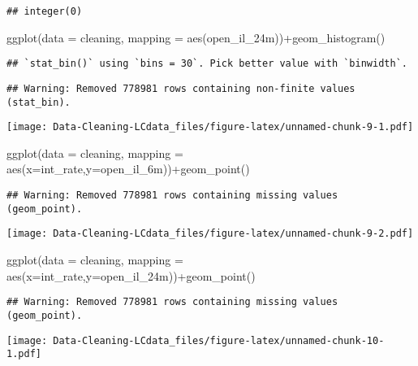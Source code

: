 \documentclass[
]{article}
\newenvironment{Shaded}{\begin{snugshade}}{\end{snugshade}}
\newcommand{\AttributeTok}[1]{\textcolor[rgb]{0.77,0.63,0.00}{#1}}
\newcommand{\ConstantTok}[1]{\textcolor[rgb]{0.00,0.00,0.00}{#1}}
\newcommand{\FunctionTok}[1]{\textcolor[rgb]{0.00,0.00,0.00}{#1}}
\newcommand{\NormalTok}[1]{#1}
\newcommand{\SpecialCharTok}[1]{\textcolor[rgb]{0.00,0.00,0.00}{#1}}
\begin{document}
\begin{Shaded}
\end{Shaded}

\begin{verbatim}
## integer(0)
\end{verbatim}

\begin{Shaded}
\begin{Highlighting}[]
\FunctionTok{ggplot}\NormalTok{(}\AttributeTok{data =}\NormalTok{ cleaning, }\AttributeTok{mapping =} \FunctionTok{aes}\NormalTok{(open\_il\_24m))}\SpecialCharTok{+}\FunctionTok{geom\_histogram}\NormalTok{()}
\end{Highlighting}
\end{Shaded}

\begin{verbatim}
## `stat_bin()` using `bins = 30`. Pick better value with `binwidth`.
\end{verbatim}

\begin{verbatim}
## Warning: Removed 778981 rows containing non-finite values (stat_bin).
\end{verbatim}

\texttt{[image: Data-Cleaning-LCdata\_files/figure-latex/unnamed-chunk-9-1.pdf]}

\begin{Shaded}
\begin{Highlighting}[]
\FunctionTok{ggplot}\NormalTok{(}\AttributeTok{data =}\NormalTok{ cleaning, }\AttributeTok{mapping =} \FunctionTok{aes}\NormalTok{(}\AttributeTok{x=}\NormalTok{int\_rate,}\AttributeTok{y=}\NormalTok{open\_il\_6m))}\SpecialCharTok{+}\FunctionTok{geom\_point}\NormalTok{()}
\end{Highlighting}
\end{Shaded}

\begin{verbatim}
## Warning: Removed 778981 rows containing missing values (geom_point).
\end{verbatim}

\texttt{[image: Data-Cleaning-LCdata\_files/figure-latex/unnamed-chunk-9-2.pdf]}

\begin{Shaded}
\begin{Highlighting}[]
\FunctionTok{ggplot}\NormalTok{(}\AttributeTok{data =}\NormalTok{ cleaning, }\AttributeTok{mapping =} \FunctionTok{aes}\NormalTok{(}\AttributeTok{x=}\NormalTok{int\_rate,}\AttributeTok{y=}\NormalTok{open\_il\_24m))}\SpecialCharTok{+}\FunctionTok{geom\_point}\NormalTok{()}
\end{Highlighting}
\end{Shaded}

\begin{verbatim}
## Warning: Removed 778981 rows containing missing values (geom_point).
\end{verbatim}

\texttt{[image: Data-Cleaning-LCdata\_files/figure-latex/unnamed-chunk-10-1.pdf]}
\end{document}
